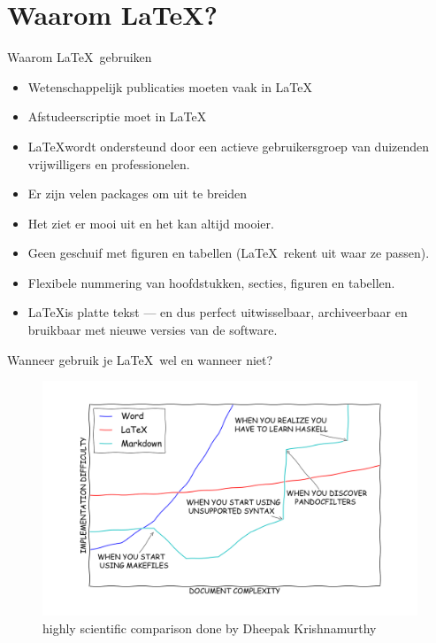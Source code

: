 \documentclass{beamer}
\begin{document}
\section{Waarom \LaTeX?}

\begin{frame}[fragile]{Waarom \LaTeX\ gebruiken}

\begin{itemize}
\item Wetenschappelijk publicaties moeten vaak in \LaTeX
\item Afstudeerscriptie moet in \LaTeX
\item \LaTeX wordt ondersteund door een actieve gebruikersgroep van duizenden vrijwilligers en professionelen.
\item Er zijn velen packages om uit te breiden
\item Het ziet er mooi uit en het kan altijd mooier.
\item Geen geschuif met figuren en tabellen (\LaTeX\ rekent uit waar ze passen).
\item Flexibele nummering van hoofdstukken, secties, figuren en tabellen.
\item \LaTeX is platte tekst — en dus perfect uitwisselbaar, archiveerbaar en bruikbaar met nieuwe versies van de software.
\end{itemize}
\end{frame}

\begin{frame}[fragile]{Wanneer gebruik je \LaTeX\ wel en wanneer niet?}

\begin{figure}
\centering
\includegraphics[width=1\textwidth]{images/learningcurve.png}
\caption{highly scientific comparison done by Dheepak Krishnamurthy}
\end{figure}

\end{frame}
\end{document}
